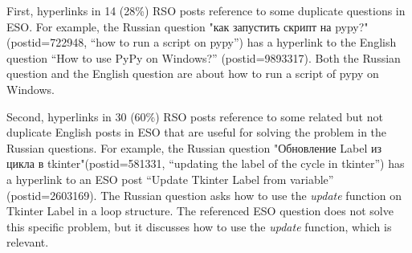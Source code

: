 
First, hyperlinks in 14 (28\%) RSO posts reference to some duplicate questions in ESO.
For example, the Russian question \foreignlanguage{russian}{"как запустить скрипт на pypy?"}(postid=722948, ``how to run a script on pypy'') has a hyperlink to the English question ``How to use PyPy on Windows?'' (postid=9893317).
Both the Russian question and the English question are about how to run a script of pypy on Windows. 

Second, hyperlinks in 30 (60\%) RSO posts reference to some related but not duplicate English posts in ESO that are useful for solving the problem in the Russian questions.
For example, the Russian question \foreignlanguage{russian}{"Обновление Label из цикла в tkinter"}(postid=581331, ``updating the label of the cycle in tkinter'') has a hyperlink to an ESO post ``Update Tkinter Label from variable'' (postid=2603169). 
The Russian question asks how to use the \textit{update}  function on Tkinter Label in a loop structure.
The referenced ESO question does not solve this specific problem, but it discusses how to use the \textit{update} function, which is relevant. 

